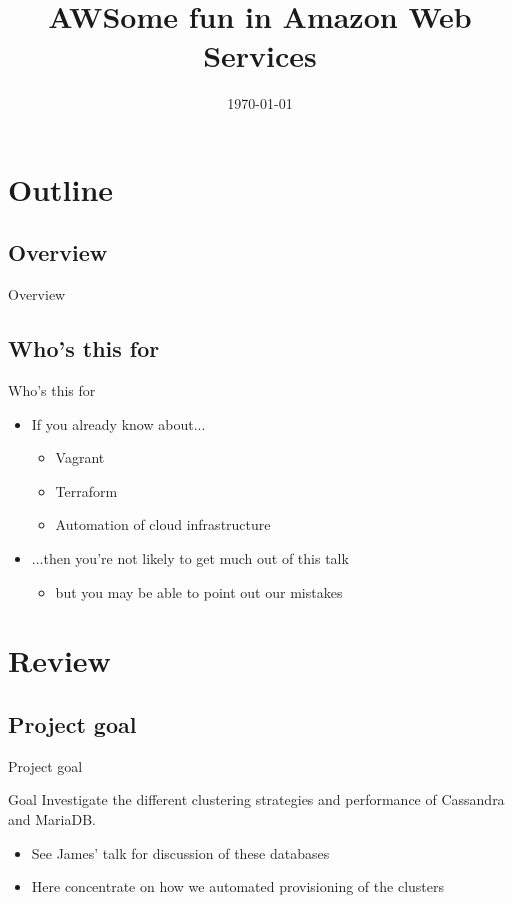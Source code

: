 \documentclass[xcolor=dvipsnames]{beamer}
\title{AWSome fun in Amazon Web Services}
\date{\today}
\begin{document}
\begin{frame}
\titlepage
\end{frame}

\section*{Outline}
\subsection*{Overview}
\begin{frame}{Overview}
  \tableofcontents[hideallsubsections]
\end{frame}

\subsection*{Who's this for}
\begin{frame}{Who's this for}
  \begin{itemize}
    \item If you already know about...
    \begin{itemize}
      \item Vagrant
      \item Terraform
      \item Automation of cloud infrastructure
    \end{itemize}
    \item ...then you're not likely to get much out of this talk
    \pause
    \begin{itemize}
      \item but you may be able to point out our mistakes \smiley
    \end{itemize}
  \end{itemize}
\end{frame}


\section{Review}
\subsection{Project goal}
\begin{frame}{Project goal}
  \begin{block}{Goal}
    Investigate the different clustering strategies and performance of
    Cassandra and MariaDB.
  \end{block}
  \pause
  \begin{itemize}
    \item See James' talk for discussion of these databases
    \item Here concentrate on how we automated provisioning of the clusters
  \end{itemize}
\end{frame}
\end{document}
